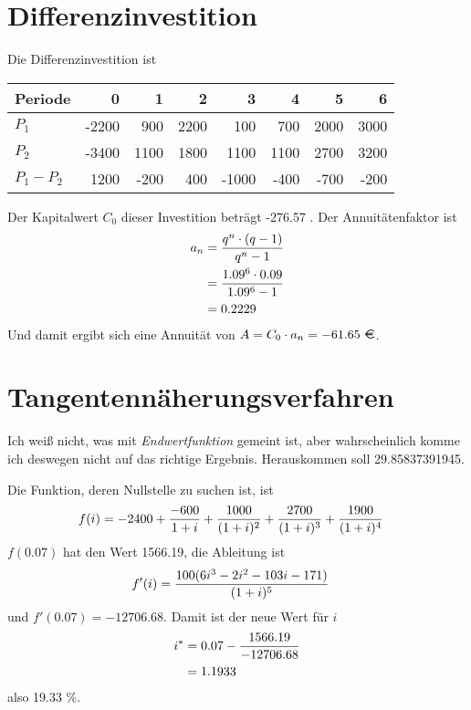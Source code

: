 \documentclass{article}
\begin{document}
	\section*{Differenzinvestition}
	Die Differenzinvestition ist
	\begin{center}
		\begin{tabular}{l|r|r|r|r|r|r|r}
			Periode & 0 & 1 & 2 & 3 & 4 & 5 & 6 \\
			\hline
			$P_1$ & -2200 & 900 & 2200 & 100 & 700 & 2000 & 3000 \\
			\hline
			$P_2$ & -3400 & 1100 & 1800 & 1100 & 1100 & 2700 & 3200 \\
			\hline\hline
			$P_1-P_2$ & 1200 & -200 & 400 & -1000 & -400 & -700 & -200
		\end{tabular}
	\end{center}
	Der Kapitalwert $C_0$ dieser Investition beträgt -276.57 \EUR. Der Annuitätenfaktor ist
	\begin{align}
		a_n &= \frac{q^n\cdot (q-1)}{q^n-1} \notag \\
		&= \frac{1.09^6\cdot 0.09}{1.09^6-1} \notag \\
		&= 0.2229 \notag
	\end{align}
	Und damit ergibt sich eine Annuität von $A=C_0\cdot a_n = -61.65\text{ \EUR}$.

	\section*{Tangentennäherungsverfahren}
	Ich weiß nicht, was mit \textit{Endwertfunktion} gemeint ist, aber wahrscheinlich komme ich deswegen nicht auf das richtige Ergebnis. Herauskommen soll 29.85837391945.
	
	Die Funktion, deren Nullstelle zu suchen ist, ist
	\begin{align}
		f(i) &= -2400 + \frac{-600}{1+i} + \frac{1000}{(1+i)^2} + \frac{2700}{(1+i)^3} + \frac{1900}{(1+i)^4} \notag
	\end{align}
	$f(0.07)$ hat den Wert 1566.19, die Ableitung ist
	\begin{align}
		f'(i) &= \frac{100(6i^3 - 2i^2 - 103i - 171)}{(1+i)^5} \notag
	\end{align}
	und $f'(0.07) = -12706.68$. Damit ist der neue Wert für $i$
	\begin{align}
		i^\ast &= 0.07 - \frac{1566.19}{-12706.68} \notag \\
		&= 1.1933 \notag
	\end{align}
	also 19.33 \%.
	
\end{document}
